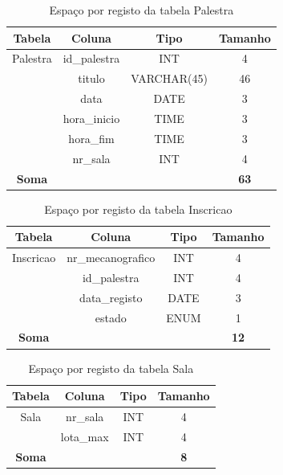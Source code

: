 \documentclass[12pt,a4paper]{article}
\renewcommand{\arraystretch}{1.5}  %
\begin{document}
\begin{table}[H]
\centering
\renewcommand{\arraystretch}{1.2}
\begin{tabular}{|c|c|c|c|}
\hline
\textbf{Tabela} & \textbf{Coluna} & \textbf{Tipo} & \textbf{Tamanho} \\ \hline
Palestra & id\_palestra & INT & 4 \\ \hline
& titulo & VARCHAR(45) & 46 \\ \hline
& data & DATE & 3 \\ \hline
& hora\_inicio & TIME & 3 \\ \hline
& hora\_fim & TIME & 3 \\ \hline
& nr\_sala & INT & 4 \\ \hline
\textbf{Soma} & & & \textbf{63} \\ \hline
\end{tabular}
\caption{Espaço por registo da tabela Palestra}
\end{table}

\begin{table}[H]
\centering
\renewcommand{\arraystretch}{1.2}
\begin{tabular}{|c|c|c|c|}
\hline
\textbf{Tabela} & \textbf{Coluna} & \textbf{Tipo} & \textbf{Tamanho} \\ \hline
Inscricao & nr\_mecanografico & INT & 4 \\ \hline
& id\_palestra & INT & 4 \\ \hline
& data\_registo & DATE & 3 \\ \hline
& estado & ENUM & 1 \\ \hline
\textbf{Soma} & & & \textbf{12} \\ \hline
\end{tabular}
\caption{Espaço por registo da tabela Inscricao}
\end{table}

\begin{table}[H]
\centering
\renewcommand{\arraystretch}{1.2}
\begin{tabular}{|c|c|c|c|}
\hline
\textbf{Tabela} & \textbf{Coluna} & \textbf{Tipo} & \textbf{Tamanho} \\ \hline
Sala & nr\_sala & INT & 4 \\ \hline
& lota\_max & INT & 4 \\ \hline
\textbf{Soma} & & & \textbf{8} \\ \hline
\end{tabular}
\caption{Espaço por registo da tabela Sala}
\end{table}
\end{document}
